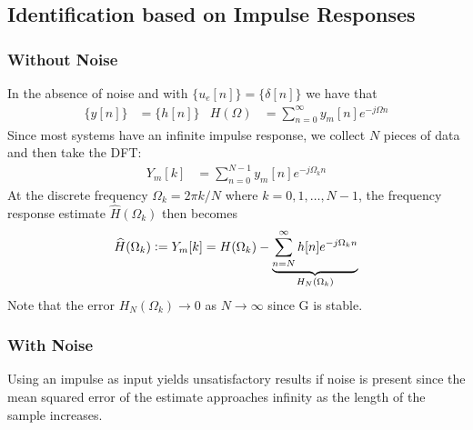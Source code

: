 \subsection{Identification based on Impulse Responses}
\subsubsection{Without Noise}
In the absence of noise and with $\{u_e[n]\} = \{\delta[n]\}$ we have that
\begin{align*}
	\{y[n]\} &= \{h[n]\} & H(\Omega) &= \sum_{n=0}^{\infty} y_m[n]e^{-j\Omega n}
\end{align*}
Since most systems have an infinite impulse response, we collect $N$ pieces of data and then take the DFT:
\begin{align*}
	Y_m[k] &= \sum_{n=0}^{N-1} y_m[n] e^{-j\Omega_k n}
\end{align*}
At the discrete frequency $\Omega_k = 2\pi k/N$ where $k = 0,1,\hdots,N-1$, the frequency response estimate $\widehat{H}(\Omega_k)$ then becomes
\begin{align*}
	\widehat{H}(\Omega_k) \vcentcolon= Y_m[k] = H(\Omega_k) - \underbrace{\sum_{n=N}^{\infty}h[n]e^{-j\Omega_k n}}_{H_N(\Omega_k)}
\end{align*} 
Note that the error $H_N(\Omega_k) \to 0$ as $N\to\infty$ since G is stable.

\subsubsection{With Noise}
Using an impulse as input yields unsatisfactory results if noise is present since the mean squared error of the estimate approaches infinity as the length of the sample increases.
